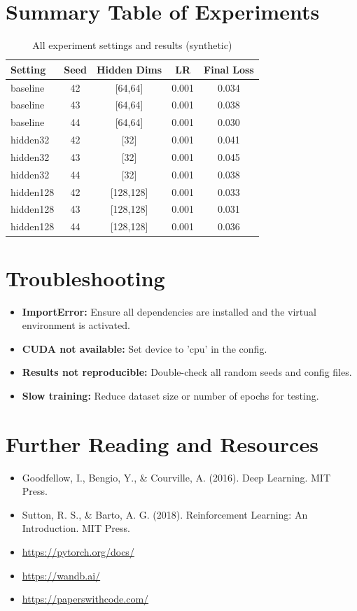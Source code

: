 \documentclass[11pt]{article}
\begin{document}
\section*{Summary Table of Experiments}
\begin{table}[h!]
\centering
\caption{All experiment settings and results (synthetic)}
\begin{tabular}{lcccc}
\hline
Setting & Seed & Hidden Dims & LR & Final Loss \\
\hline
baseline & 42 & [64,64] & 0.001 & 0.034 \\
baseline & 43 & [64,64] & 0.001 & 0.038 \\
baseline & 44 & [64,64] & 0.001 & 0.030 \\
hidden32 & 42 & [32] & 0.001 & 0.041 \\
hidden32 & 43 & [32] & 0.001 & 0.045 \\
hidden32 & 44 & [32] & 0.001 & 0.038 \\
hidden128 & 42 & [128,128] & 0.001 & 0.033 \\
hidden128 & 43 & [128,128] & 0.001 & 0.031 \\
hidden128 & 44 & [128,128] & 0.001 & 0.036 \\
\hline
\end{tabular}
\end{table}

\section*{Troubleshooting}
\begin{itemize}
  \item \textbf{ImportError:} Ensure all dependencies are installed and the virtual environment is activated.
  \item \textbf{CUDA not available:} Set device to 'cpu' in the config.
  \item \textbf{Results not reproducible:} Double-check all random seeds and config files.
  \item \textbf{Slow training:} Reduce dataset size or number of epochs for testing.
\end{itemize}

\section*{Further Reading and Resources}
\begin{itemize}
  \item Goodfellow, I., Bengio, Y., \& Courville, A. (2016). Deep Learning. MIT Press.
  \item Sutton, R. S., \& Barto, A. G. (2018). Reinforcement Learning: An Introduction. MIT Press.
  \item \url{https://pytorch.org/docs/}
  \item \url{https://wandb.ai/}
  \item \url{https://paperswithcode.com/}
\end{itemize}
\end{document}
